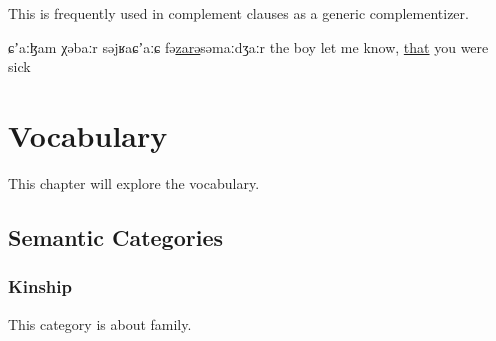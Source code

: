 \documentclass[a4paper, 10pt]{book}
\begin{document}
This is frequently used in complement clauses as a generic complementizer.
\begin{exe}
\ex
\begin{xlist}
    \ex {}
    \ex {}
    {ɕʼaːɮam χəbaːr səjʁaɕʼaːɕ fə\underline{zarə}səmaːdʒaːr}
    {the boy let me know, \underline{that} you were sick}
    \ex {}
\end{xlist}
\end{exe}


\chapter{Vocabulary}
This chapter will explore the vocabulary.
\section{Semantic Categories}
\subsection{Kinship}
This category is about family.
\end{document}
